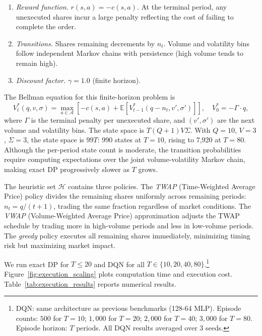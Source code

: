 \begin{definition}
\begin{enumerate}
    where $n_t$ is the number of shares traded, $\phi(v)$ is a volume-dependent impact scaling (higher in low-volume regimes), $\psi(\sigma)$ is a volatility-dependent risk scaling, $\kappa_{\mathrm{temp}}$ and $\kappa_{\mathrm{perm}}$ are impact coefficients, and $\lambda$ is the risk aversion parameter.
    \item \emph{Reward function.} $r(s, a) = -c(s, a)$. At the terminal period, any unexecuted shares incur a large penalty reflecting the cost of failing to complete the order.
    \item \emph{Transitions.} Shares remaining decrements by $n_t$. Volume and volatility bins follow independent Markov chains with persistence (high volume tends to remain high).
    \item \emph{Discount factor.} $\gamma = 1.0$ (finite horizon).
\end{enumerate}
\end{definition}

The Bellman equation for this finite-horizon problem is
\begin{equation}
\label{eq:execution_bellman}
V^*_t(q, v, \sigma) = \max_{a \in \mathcal{A}} \left[ -c(s, a) + \mathbb{E}\left[ V^*_{t-1}(q - n_t, v', \sigma') \right] \right], \quad V^*_0 = -\Gamma \cdot q,
\end{equation}
where $\Gamma$ is the terminal penalty per unexecuted share, and $(v', \sigma')$ are the next volume and volatility bins. The state space is $T(Q+1)V\Sigma$. With $Q = 10$, $V = 3$, $\Sigma = 3$, the state space is $99T$: 990 states at $T = 10$, rising to 7,920 at $T = 80$. Although the per-period state count is moderate, the transition probabilities require computing expectations over the joint volume-volatility Markov chain, making exact DP progressively slower as $T$ grows.

The heuristic set $\mathcal{H}$ contains three policies. The \emph{TWAP} (Time-Weighted Average Price) policy divides the remaining shares uniformly across remaining periods: $n_t = q / (t+1)$, trading the same fraction regardless of market conditions. The \emph{VWAP} (Volume-Weighted Average Price) approximation adjusts the TWAP schedule by trading more in high-volume periods and less in low-volume periods. The \emph{greedy} policy executes all remaining shares immediately, minimizing timing risk but maximizing market impact.

We run exact DP for $T \leq 20$ and DQN for all $T \in \{10, 20, 40, 80\}$.\footnote{DQN: same architecture as previous benchmarks (128-64 MLP). Episode counts: $500$ for $T = 10$; $1{,}000$ for $T = 20$; $2{,}000$ for $T = 40$; $3{,}000$ for $T = 80$. Episode horizon: $T$ periods. All DQN results averaged over 3 seeds.} Figure~\ref{fig:execution_scaling} plots computation time and execution cost. Table~\ref{tab:execution_results} reports numerical results.

